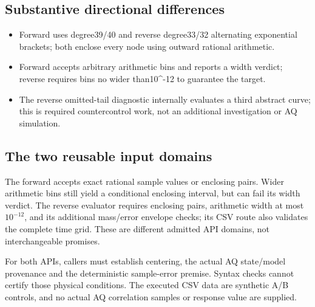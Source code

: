 
\par{}

\subsection*{Substantive directional differences}

\begin{itemize}

\item Forward uses degree39/40 and reverse degree33/32 alternating exponential brackets; both enclose every node using outward rational arithmetic.

\item Forward accepts arbitrary arithmetic bins and reports a width verdict; reverse requires bins no wider than10\textasciicircum{}-12 to guarantee the target.

\item The reverse omitted-tail diagnostic internally evaluates a third abstract curve; this is required countercontrol work, not an additional investigation or AQ simulation.

\end{itemize}

\subsection*{The two reusable input domains}

The forward  accepts exact rational sample values or enclosing pairs. Wider arithmetic bins still yield a conditional enclosing interval, but can fail its width verdict. The reverse  evaluator requires enclosing pairs, arithmetic width at most $10^{-12}$, and its additional mass/error envelope checks; its CSV route also validates the complete time grid. These are different admitted API domains, not interchangeable promises.

For both APIs, callers must establish centering, the actual AQ state/model provenance and the deterministic sample-error premise. Syntax checks cannot certify those physical conditions. The executed CSV data are synthetic A/B controls, and no actual AQ correlation samples or response value are supplied.

